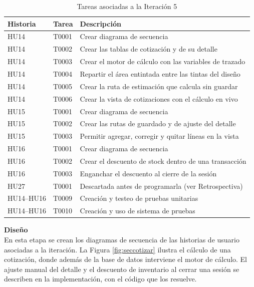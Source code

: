 \documentclass[12pt,letterpaper,oneside]{report}
\newcommand{\tituloparpegado}[1]{\par\textbf{#1}\\\indent\ignorespaces}
\begin{document}
\begin{table}[H]
  \centering
  \caption{Tareas asociadas a la Iteración 5}
  \label{tab:tareas5}
  \renewcommand{\arraystretch}{1.2}
  \begin{tabular}{|l|l|p{7.2cm}|}
    \hline
    \textbf{Historia} & \textbf{Tarea} & \textbf{Descripción} \\
    \hline
    HU14 & T0001 & Crear diagrama de secuencia \\ \hline
    HU14 & T0002 & Crear las tablas de cotización y de su detalle \\ \hline
    HU14 & T0003 & Crear el motor de cálculo con las variables de trazado \\ \hline
    HU14 & T0004 & Repartir el área entintada entre las tintas del diseño \\ \hline
    HU14 & T0005 & Crear la ruta de estimación que calcula sin guardar \\ \hline
    HU14 & T0006 & Crear la vista de cotizaciones con el cálculo en vivo \\ \hline
    HU15 & T0001 & Crear diagrama de secuencia \\ \hline
    HU15 & T0002 & Crear las rutas de guardado y de ajuste del detalle \\ \hline
    HU15 & T0003 & Permitir agregar, corregir y quitar líneas en la vista \\ \hline
    HU16 & T0001 & Crear diagrama de secuencia \\ \hline
    HU16 & T0002 & Crear el descuento de stock dentro de una transacción \\ \hline
    HU16 & T0003 & Enganchar el descuento al cierre de la sesión \\ \hline
    HU27 & T0001 & Descartada antes de programarla (ver Retrospectiva) \\ \hline
    HU14--HU16 & T0009 & Creación y testeo de pruebas unitarias \\ \hline
    HU14--HU16 & T0010 & Creación y uso de sistema de pruebas \\ \hline
  \end{tabular}
\end{table}

\vspace{0.3cm}
\tituloparpegado{Diseño}
En esta etapa se crean los diagramas de secuencia de las historias de usuario asociadas a la iteración. La Figura \ref{fig:seccotizar} ilustra el cálculo de una cotización, donde además de la base de datos interviene el motor de cálculo. El ajuste manual del detalle y el descuento de inventario al cerrar una sesión se describen en la implementación, con el código que los resuelve.
\end{document}
